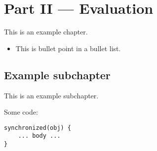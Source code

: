 \chapter{Part II --- Evaluation}
This is an example chapter.
\begin{itemize}
    \item This is bullet point in a bullet list.
\end{itemize}

\section{Example subchapter}
This is an example subchapter.

Some code:
\begin{lstlisting}
synchronized(obj) {
    ... body ...
}
\end{lstlisting}
